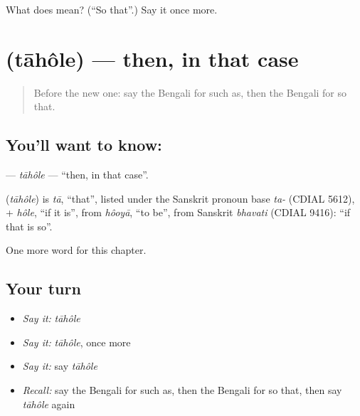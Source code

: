 \begin{tcolorbox}[breakable,colback=teal!4,colframe=teal!35!black,title={Before you move on}]
What does  mean? (\textquotedblleft{}So that\textquotedblright{}.) Say it once more.
\end{tcolorbox}
\section[\texorpdfstring{\bn{তাহলে} (tāhôle)}{তাহলে (tāhôle)}]{ (tāhôle) — then, in that case}

\label{lesson:BN-C218-tahole}



\begin{quote}
Before the new one: say the Bengali for such as, then the Bengali for so that.
\end{quote}

\subsection*{You'll want to know: }
\textbf{} — \emph{tāhôle} — \textquotedblleft{}then, in that case\textquotedblright{}.

\begin{cousinweb}
\textbf{} (\emph{tāhôle}) is \emph{tā}, \textquotedblleft{}that\textquotedblright{}, listed under the Sanskrit pronoun base \emph{ta-} (CDIAL 5612), + \emph{hôle}, \textquotedblleft{}if it is\textquotedblright{}, from \emph{hôoyā}, \textquotedblleft{}to be\textquotedblright{}, from Sanskrit \emph{bhavati} (CDIAL 9416): \textquotedblleft{}if that is so\textquotedblright{}.
\end{cousinweb}

\begin{grammarlens}[title={What you've built}]
One more word for this chapter.
\end{grammarlens}

\subsection*{Your turn}
\begin{itemize}
\raggedright
  \item \emph{Say it:} \emph{tāhôle}
  \item \emph{Say it:} \emph{tāhôle}, once more
  \item \emph{Say it:} say \emph{tāhôle}
  \item \emph{Recall:} say the Bengali for such as, then the Bengali for so that, then say \emph{tāhôle} again
\end{itemize}

